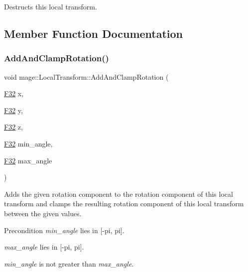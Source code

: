 Destructs this local transform. 

\subsection{Member Function Documentation}
\mbox{\label{classmage_1_1_local_transform_aa5c60513e379baae81f79cea835d1896}} 
\subsubsection{\texorpdfstring{Add\+And\+Clamp\+Rotation()}{AddAndClampRotation()}\hspace{0.1cm}{\footnotesize\ttfamily [1/3]}}
{\footnotesize\ttfamily void mage\+::\+Local\+Transform\+::\+Add\+And\+Clamp\+Rotation (\begin{DoxyParamCaption}\item[{\mbox{\hyperlink{namespacemage_aa97e833b45f06d60a0a9c4fc22ae02c0}{F32}}}]{x,  }\item[{\mbox{\hyperlink{namespacemage_aa97e833b45f06d60a0a9c4fc22ae02c0}{F32}}}]{y,  }\item[{\mbox{\hyperlink{namespacemage_aa97e833b45f06d60a0a9c4fc22ae02c0}{F32}}}]{z,  }\item[{\mbox{\hyperlink{namespacemage_aa97e833b45f06d60a0a9c4fc22ae02c0}{F32}}}]{min\+\_\+angle,  }\item[{\mbox{\hyperlink{namespacemage_aa97e833b45f06d60a0a9c4fc22ae02c0}{F32}}}]{max\+\_\+angle }\end{DoxyParamCaption})\hspace{0.3cm}{\ttfamily [noexcept]}}

Adds the given rotation component to the rotation component of this local transform and clamps the resulting rotation component of this local transform between the given values.

\begin{DoxyPrecond}{Precondition}
{\itshape min\+\_\+angle} lies in \mbox{[}-\/pi, pi\mbox{]}. 

{\itshape max\+\_\+angle} lies in \mbox{[}-\/pi, pi\mbox{]}. 

{\itshape min\+\_\+angle} is not greater than {\itshape max\+\_\+angle}. 
\end{DoxyPrecond}


